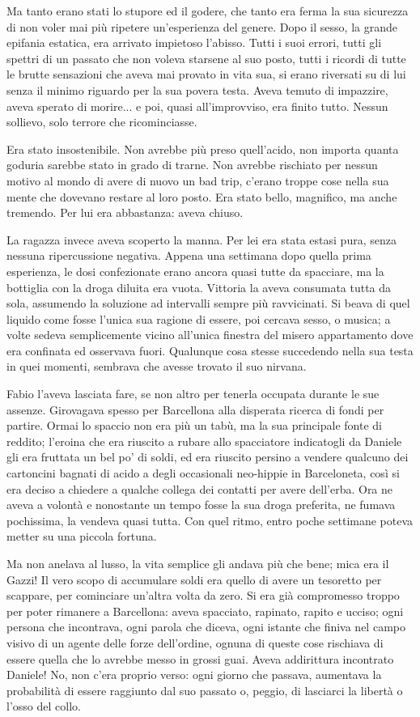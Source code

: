 Ma tanto erano stati lo stupore ed il godere, che tanto era ferma la sua sicurezza di non voler mai più ripetere un'esperienza del genere. Dopo il sesso, la grande epifania estatica, era arrivato impietoso l'abisso. Tutti i suoi errori, tutti gli spettri di un passato che non voleva starsene al suo posto, tutti i ricordi di tutte le brutte sensazioni che aveva mai provato in vita sua, si erano riversati su di lui senza il minimo riguardo per la sua povera testa. Aveva temuto di impazzire, aveva sperato di morire... e poi, quasi all'improvviso, era finito tutto. Nessun sollievo, solo terrore che ricominciasse.

Era stato insostenibile. Non avrebbe più preso quell'acido, non importa quanta goduria sarebbe stato in grado di trarne. Non avrebbe rischiato per nessun motivo al mondo di avere di nuovo un bad trip, c'erano troppe cose nella sua mente che dovevano restare al loro posto. Era stato bello, magnifico, ma anche tremendo. Per lui era abbastanza: aveva chiuso.

La ragazza invece aveva scoperto la manna. Per lei era stata estasi pura, senza nessuna ripercussione negativa. Appena una settimana dopo quella prima esperienza, le dosi confezionate erano ancora quasi tutte da spacciare, ma la bottiglia con la droga diluita era vuota. Vittoria la aveva consumata tutta da sola, assumendo la soluzione ad intervalli sempre più ravvicinati. Si beava di quel liquido come fosse l'unica sua ragione di essere, poi cercava sesso, o musica; a volte sedeva semplicemente vicino all'unica finestra del misero appartamento dove era confinata ed osservava fuori. Qualunque cosa stesse succedendo nella sua testa in quei momenti, sembrava che avesse trovato il suo nirvana.

Fabio l'aveva lasciata fare, se non altro per tenerla occupata durante le sue assenze. Girovagava spesso per Barcellona alla disperata ricerca di fondi per partire. Ormai lo spaccio non era più un tabù, ma la sua principale fonte di reddito; l'eroina che era riuscito a rubare allo spacciatore indicatogli da Daniele gli era fruttata un bel po' di soldi, ed era riuscito persino a vendere qualcuno dei cartoncini bagnati di acido a degli occasionali neo-hippie in Barceloneta, così si era deciso a chiedere a qualche collega dei contatti per avere dell'erba. Ora ne aveva a volontà e nonostante un tempo fosse la sua droga preferita, ne fumava pochissima, la vendeva quasi tutta. Con quel ritmo, entro poche settimane poteva metter su una piccola fortuna.

Ma non anelava al lusso, la vita semplice gli andava più che bene; mica era il Gazzi! Il vero scopo di accumulare soldi era quello di avere un tesoretto per scappare, per cominciare un'altra volta da zero. Si era già compromesso troppo per poter rimanere a Barcellona: aveva spacciato, rapinato, rapito e ucciso; ogni persona che incontrava, ogni parola che diceva, ogni istante che finiva nel campo visivo di un agente delle forze dell'ordine, ognuna di queste cose rischiava di essere quella che lo avrebbe messo in grossi guai. Aveva addirittura incontrato Daniele! No, non c'era proprio verso: ogni giorno che passava, aumentava la probabilità di essere raggiunto dal suo passato o, peggio, di lasciarci la libertà o l'osso del collo.

